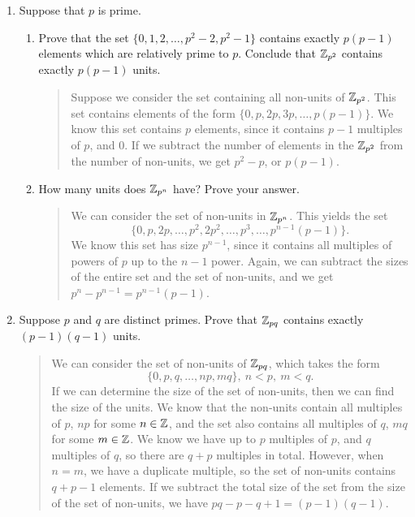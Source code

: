\documentclass{hw}
\begin{document}
\begin{enumerate}
\item Suppose that $p$ is prime.
\begin{enumerate}
\item Prove that the set $\{0,1,2,\dots,p^{2}-2,p^{2}-1\}$ contains exactly $p(p-1)$ elements which
are relatively prime to $p$. Conclude that $\mathbb{Z}_{p^{2}}$ contains exactly $p(p-1)$ units.
\begin{quote}
Suppose we consider the set containing all non-units of $\mathbb{Z}_{p^{2}}$. This set contains elements of
the form $\{0,p,2p,3p,\dots,p(p-1)\}$. We know this set contains $p$ elements, since it contains
$p-1$ multiples of $p$, and 0. If we subtract the number of elements in the $\mathbb{Z}_{p^{2}}$ from the
number of non-units, we get $p^{2}-p$, or $p(p-1)$.
\end{quote}
\item How many units does $\mathbb{Z}_{p^{n}}$ have? Prove your answer.
\begin{quote}
We can consider the set of non-units in $\mathbb{Z}_{p^{n}}$. This yields the set
\[\{0,p,2p,\dots,p^2,2p^{2},\dots,p^{3},\dots,p^{n-1}(p-1)\}.\] We know this set has size $p^{n-1}$,
since it contains all multiples of powers of $p$ up to the $n-1$ power. Again, we can subtract the
sizes of the entire set and the set of non-units, and we get $p^{n}-p^{n-1}=p^{n-1}(p-1)$.
\end{quote}
\end{enumerate}

\item Suppose $p$ and $q$ are distinct primes. Prove that $\mathbb{Z}_{pq}$ contains exactly $(p-1)(q-1)$
units.
\begin{quote}
We can consider the set of non-units of $\mathbb{Z}_{pq}$, which takes the form
\[\{0,p,q,\dots,np,mq\},\ n<p,\ m<q.\]
If we can determine the size of the set of non-units, then we can find the size of the units. We know
that the non-units contain all multiples of $p$, $np$ for some $n\in\mathbb{Z}$, and the set also contains
all multiples of $q$, $mq$ for some $m\in\mathbb{Z}$. We know we have up to $p$ multiples of $p$, and $q$
multiples of $q$, so there are $q+p$ multiples in total. However, when $n=m$, we have a duplicate
multiple, so the set of non-units contains $q+p-1$ elements. If we subtract the total size of the
set from the size of the set of non-units, we have $pq-p-q+1=(p-1)(q-1)$.
\end{quote}
\end{enumerate}
\end{document}
